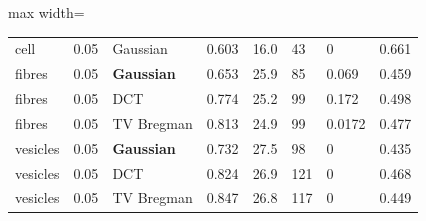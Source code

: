 \begin{center}
\begin{adjustbox}{max width=\linewidth}
\begin{tabular}{llllllll}
cell & 0.05 & Gaussian & 0.603 & 16.0 & 43 & 0 & 0.661 \\
fibres & 0.05 & \textbf{Gaussian} & 0.653 & 25.9 & 85 & 0.069 & 0.459 \\
fibres & 0.05 & DCT & 0.774 & 25.2 & 99 & 0.172 & 0.498 \\
fibres & 0.05 & TV Bregman & 0.813 & 24.9 & 99 & 0.0172 & 0.477 \\
vesicles & 0.05 & \textbf{Gaussian} & 0.732 & 27.5 & 98 & 0 & 0.435 \\
vesicles & 0.05 & DCT & 0.824 & 26.9 & 121 & 0 & 0.468 \\
vesicles & 0.05 & TV Bregman & 0.847 & 26.8 & 117 & 0 & 0.449 \\
\bottomrule
\end{tabular}\end{adjustbox}\end{center}
